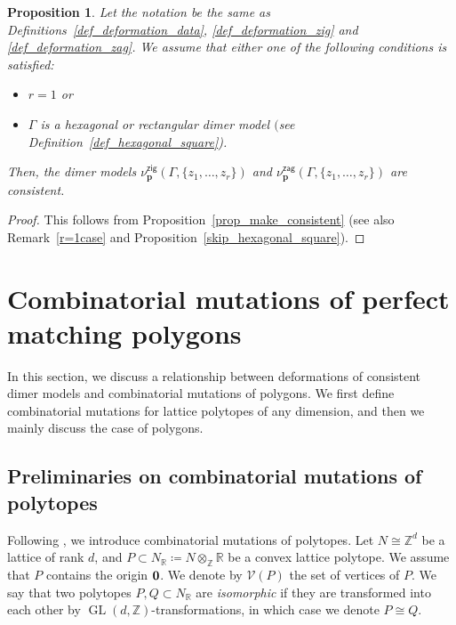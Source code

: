 \documentclass[11pt]{article}
\numberwithin{equation}{section}
\numberwithin{equation}{section}
\numberwithin{figure}{section}
\numberwithin{table}{section}
\newtheorem{Proposition}[Theorem]{Proposition}
 { \theoremstyle{definition}
\newtheorem{Definition}[Theorem]{Definition}
\newtheorem{Note}[Theorem]{Note}
\newtheorem{Example}[Theorem]{Example}
\newtheorem{Remark}[Theorem]{Remark}
\newtheorem{observation}[Theorem]{Observation}
\newtheorem{operation}[Theorem]{Operation}
\newtheorem{setting}[Theorem]{Setting}}
\newcommand{\ZZ}{\mathbb{Z}}
\newcommand{\RR}{\mathbb{R}}
\newcommand{\calV}{\mathcal{V}}
\newcommand{\bfp}{\mathbf{p}}
\newcommand{\GL}{\operatorname{GL}}
\newcommand{\zig}{\mathsf{zig}}
\newcommand{\zag}{\mathsf{zag}}
\begin{document}
\setcounter{Theorem}{4}
\begin{Proposition}\label{prop_preserve_consistent1}
Let the notation be the same as Definitions~{\rm \ref{def_deformation_data}}, {\rm \ref{def_deformation_zig}} and {\rm \ref{def_deformation_zag}}.
We assume that either one of the following conditions is satisfied:
\begin{itemize}\itemsep=0pt
\item[$(i)$] $r=1$ or
\item[$(ii)$] $\Gamma$ is a hexagonal or rectangular dimer model $($see Definition~{\rm \ref{def_hexagonal_square})}.
\end{itemize}
Then, the dimer models $\nu^\zig_\bfp(\Gamma, \{z_1,\dots,z_r\})$ and $\nu^\zag_\bfp(\Gamma, \{z_1,\dots,z_r\})$ are consistent.
\end{Proposition}

\begin{proof}This follows from Proposition~\ref{prop_make_consistent} (see also Remark~\ref{r=1case} and Proposition~\ref{skip_hexagonal_square}).
\end{proof}


\section{Combinatorial mutations of perfect matching polygons}\label{sec_mutation_polygon1}
In this section, we discuss a relationship between deformations of consistent dimer models and combinatorial mutations of polygons.
We first define combinatorial mutations for lattice polytopes of any dimension, and then we mainly discuss the case of polygons.

\subsection{Preliminaries on combinatorial mutations of polytopes}\label{sec_pre_mutation_polygon}

Following \cite{ACGK}, we introduce combinatorial mutations of polytopes.
Let $N\cong\ZZ^d$ be a lattice of rank $d$, and $P\subset N_\RR\coloneqq N\otimes_\ZZ\RR$ be a convex lattice polytope.
We assume that $P$ contains the origin ${\bf 0}$.
We denote by $\calV(P)$ the set of vertices of $P$.
We say that two polytopes $P,Q\subset N_\RR$ are \emph{isomorphic} if they are transformed into each other by $\GL(d,\ZZ)$-transformations, in which case we denote $P\cong Q$.
\end{document}

